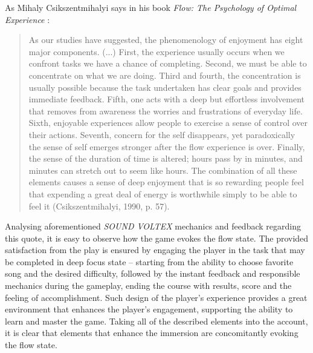 As Mihaly Csikszentmihalyi says in his book \textit{Flow: The Psychology of Optimal Experience} \cite{csikszentmihalyi1990flow}:
\begin{quote}
    As our studies have suggested, the phenomenology of enjoyment has eight major components. (...) First, the experience usually occurs when we confront tasks we have a chance of completing. Second, we must be able to concentrate on what we are doing. Third and fourth, the concentration is usually possible because the task undertaken has clear goals and provides immediate feedback. Fifth, one acts with a deep but effortless involvement that removes from awareness the worries and frustrations of everyday life. Sixth, enjoyable experiences allow people to exercise a sense of control over their actions. Seventh, concern for the self disappears, yet paradoxically the sense of self emerges stronger after the flow experience is over. Finally, the sense of the duration of time is altered; hours pass by in minutes, and minutes can stretch out to seem like hours. The
    combination of all these elements causes a sense of deep enjoyment that is so rewarding people feel that expending a great deal of energy is worthwhile simply to be able to feel it (Csikszentmihalyi, 1990, p. 57).
\end{quote}

Analysing aforementioned \textit{SOUND VOLTEX} mechanics and feedback regarding this quote, it is easy to observe how the game evokes the flow state. The provided satisfaction from the play is ensured by engaging the player in the task that may be completed in deep focus state -- starting from the ability to choose favorite song and the desired difficulty, followed by the instant feedback and responsible mechanics during the gameplay, ending the course with results, score and the feeling of accomplishment. Such design of the player's experience provides a great environment that enhances the player's engagement, supporting the ability to learn and master the game. Taking all of the described elements into the account, it is clear that elements that enhance the immersion are concomitantly evoking the flow state.